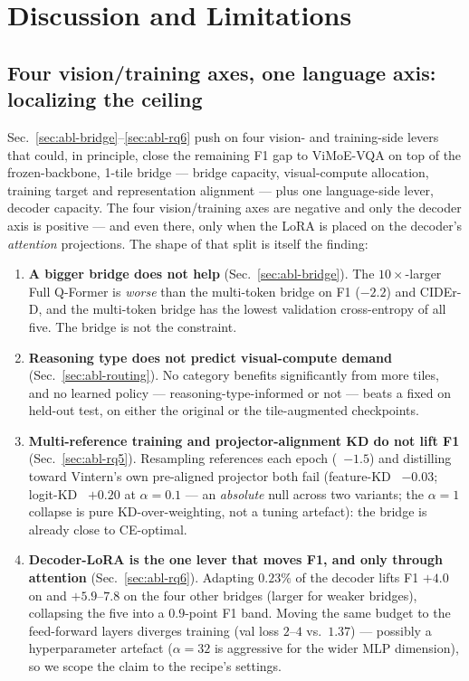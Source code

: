 \section{Discussion and Limitations}
\label{sec:discussion}

\subsection{Four vision/training axes, one language axis: localizing the ceiling}

Sec.~\ref{sec:abl-bridge}--\ref{sec:abl-rq6} push on four vision- and
training-side levers that could, in principle, close the remaining F1 gap to
ViMoE-VQA on top of the frozen-backbone, 1-tile bridge --- bridge capacity,
visual-compute allocation, training target and representation alignment --- plus
one language-side lever, decoder capacity. The four vision/training axes are
negative and only the decoder axis is positive --- and even there, only when the
LoRA is placed on the decoder's \emph{attention} projections. The shape of that
split is itself the finding:

\begin{enumerate}
\item \textbf{A bigger bridge does not help} (Sec.~\ref{sec:abl-bridge}). The
  $10\times$-larger Full Q-Former is \emph{worse} than the multi-token bridge on
  F1 ($-2.2$) and CIDEr-D, and the multi-token bridge has the lowest validation
  cross-entropy of all five. The bridge is not the constraint.
\item \textbf{Reasoning type does not predict visual-compute demand}
  (Sec.~\ref{sec:abl-routing}). No category benefits significantly from more
  tiles, and no learned policy --- reasoning-type-informed or not --- beats a
  fixed  on held-out test, on either the original or the
  tile-augmented checkpoints.
\item \textbf{Multi-reference training and projector-alignment KD do not lift F1}
  (Sec.~\ref{sec:abl-rq5}). Resampling references each epoch (\dF{}~$-1.5$) and
  distilling toward Vintern's own pre-aligned projector both fail (feature-KD
  \dF{}~$-0.03$; logit-KD \dF{}~$+0.20$ at $\alpha{=}0.1$ --- an \emph{absolute}
  null across two variants; the $\alpha{=}1$ collapse is pure KD-over-weighting,
  not a tuning artefact): the bridge is already close to CE-optimal.
\item \textbf{Decoder-LoRA is the one lever that moves F1, and only through
  attention} (Sec.~\ref{sec:abl-rq6}). Adapting $0.23\%$ of the decoder lifts F1
  $+4.0$ on \multitoken{} and $+5.9$--$7.8$ on the four other bridges (larger for
  weaker bridges), collapsing the five into a $0.9$-point F1 band. Moving the same
  budget to the feed-forward layers diverges training (val loss $2$--$4$ vs.\
  $1.37$) --- possibly a hyperparameter artefact ($\alpha=32$ is aggressive for
  the wider MLP dimension), so we scope the claim to the recipe's settings.
\end{enumerate}

